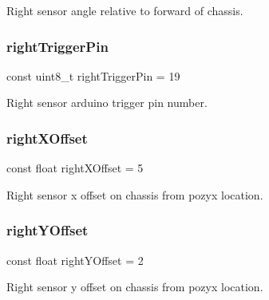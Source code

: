 Right sensor angle relative to forward of chassis. 

\mbox{\label{bot_main_8ino_a906054d9d48970211789ac841d331898}} 
\subsubsection{\texorpdfstring{right\+Trigger\+Pin}{rightTriggerPin}}
{\footnotesize\ttfamily const uint8\+\_\+t right\+Trigger\+Pin = 19}



Right sensor arduino trigger pin number. 

\mbox{\label{bot_main_8ino_ac932cddb5bc68094c96d0034c92faef9}} 
\subsubsection{\texorpdfstring{right\+X\+Offset}{rightXOffset}}
{\footnotesize\ttfamily const float right\+X\+Offset = 5}



Right sensor x offset on chassis from pozyx location. 

\mbox{\label{bot_main_8ino_a07903b96b48e8e456debd9cc43c7af05}} 
\subsubsection{\texorpdfstring{right\+Y\+Offset}{rightYOffset}}
{\footnotesize\ttfamily const float right\+Y\+Offset = 2}



Right sensor y offset on chassis from pozyx location. 

